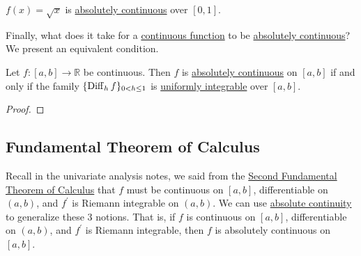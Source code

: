   \begin{example}
    \label{ex:absolutely-continuous-but-not-lipschitz}
    $f(x) = \sqrt{x}$ is \hyperref[def:absolutely-continuous-function]{absolutely continuous} over $[0, 1]$. 
  \end{example}

	Finally, what does it take for a \hyperref[pst-def:continuous_func]{continuous function} to be \hyperref[def:absolutely-continuous-function]{absolutely continuous}? We present an equivalent condition. 

  \begin{theorem}[Continuity + Uniform Integrable = Absolute Continuity]
    \label{thm:cui-ac}
    Let $f: [a, b] \to \mathbb{R}$ be continuous. Then $f$ is \hyperref[def:absolutely-continuous-function]{absolutely continuous} on $[a, b]$ if and only if the family $\{ \operatorname{Diff}_h f \}_{0 < h \leq 1}$ is \hyperref[def:uniformly-integrable]{uniformly integrable} over $[a, b]$. 
  \end{theorem}
  \begin{proof}
    
  \end{proof}

\subsection{Fundamental Theorem of Calculus}

	Recall in the univariate analysis notes, we said from the \hyperref[real-thm:ftc2]{Second Fundamental Theorem of Calculus} that $f$ must be continuous on $[a, b]$, differentiable on $(a, b)$, and $f^\prime$ is Riemann integrable on $(a, b)$. We can use \hyperref[def:absolutely-continuous-function]{absolute continuity} to generalize these 3 notions. That is, if $f$ is continuous on $[a, b]$, differentiable on $(a, b)$, and $f^\prime$ is Riemann integrable, then $f$ is absolutely continuous on $[a, b]$. 

